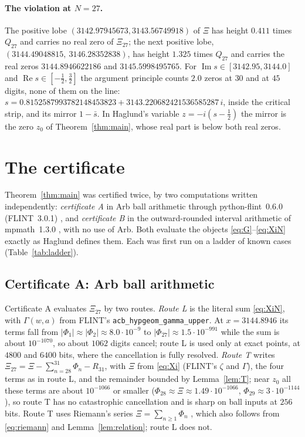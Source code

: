 \documentclass[11pt]{article}
\theoremstyle{plain}
\theoremstyle{definition}
\theoremstyle{remark}
\newcommand{\re}{\operatorname{Re}}
\newcommand{\im}{\operatorname{Im}}
\begin{document}
\paragraph{The violation at $N = 27$.} The positive lobe
$(3142.97945673, 3143.56749918)$ of $\Xi$ has height $0.411$ times $Q_{27}$ and
carries no real zero of $\Xi_{27}$; the next positive lobe,
$(3144.49048815,\allowbreak\ 3146.28352838)$, has height $1.325$ times $Q_{27}$ and carries
the real zeros $3144.8946622186$ and $3145.5998495765$. For
$\im s \in [3142.95, 3144.0]$ and $\re s \in [-\tfrac12, \tfrac32]$ the argument
principle counts $2.0$ zeros at $30$ and at $45$ digits, none of them on the
line: $s = 0.8152587993782148453823 + 3143.220682421536585287\,i$, inside the
critical strip, and its mirror $1 - \bar s$. In Haglund's variable
$z = -i(s - \tfrac12)$ the mirror is the zero $z_0$ of
Theorem~\ref{thm:main}, whose real part is below both real zeros.

\section{The certificate}
\label{sec:cert}

Theorem~\ref{thm:main} was certified twice, by two computations written
independently: \emph{certificate A}
in Arb ball arithmetic \cite{Arb} through python-flint~0.6.0 (FLINT~3.0.1)
\cite{FLINT}, and \emph{certificate B} in the outward-rounded interval arithmetic
of mpmath~1.3.0 \cite{mpmath}, with no use of Arb. Both evaluate the objects
\eqref{eq:G}--\eqref{eq:XiN} exactly as Haglund defines them. Each was first run
on a ladder of known cases (Table~\ref{tab:ladder}).

\subsection{Certificate A: Arb ball arithmetic}

Certificate A evaluates $\Xi_{27}$ by two routes. \emph{Route L} is the literal
sum \eqref{eq:XiN}, with $\Gamma(w, a)$ from FLINT's
\texttt{acb\_hypgeom\_gamma\_upper}. At $x = 3144.8946$ its terms fall from
$|\Phi_1| \approx |\Phi_2| \approx 8.0\cdot10^{-9}$ to
$|\Phi_{27}| \approx 1.5\cdot10^{-991}$ while the sum is about $10^{-1070}$, so
about $1062$ digits cancel; route L is used only at exact points, at $4800$ and
$6400$ bits, where the cancellation is fully resolved. \emph{Route T} writes
$\Xi_{27} = \Xi - \sum_{n=28}^{31}\Phi_n - R_{31}$, with $\Xi$ from
\eqref{eq:Xi} (FLINT's $\zeta$ and $\Gamma$), the four terms as in route L, and
the remainder bounded by Lemma~\ref{lem:T}; near $z_0$ all these terms are about
$10^{-1066}$ or smaller ($\Phi_{28} \approx \Xi \approx 1.49\cdot10^{-1066}$,
$\Phi_{29} \approx 3\cdot10^{-1144}$), so route T has no catastrophic
cancellation and is sharp on ball inputs at $256$ bits. Route T uses Riemann's
series
$\Xi = \sum_{n\ge1}\Phi_n$ \cite[(12), p.~3]{Hag}, which also follows from \eqref{eq:riemann}
and Lemma~\ref{lem:relation}; route L does not.
\end{document}
